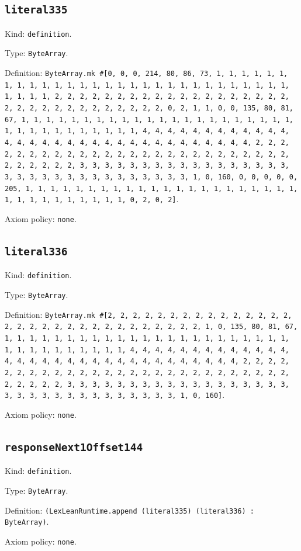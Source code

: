 \documentclass[11pt]{article}
\begin{document}
\subsection*{\texttt{literal335}}
\noindent Kind: \texttt{definition}.\par
\noindent Type: \texttt{ByteArray}.\par
\noindent Definition: \texttt{ByteArray.mk \#[0, 0, 0, 214, 80, 86, 73, 1, 1, 1, 1, 1, 1, 1, 1, 1, 1, 1, 1, 1, 1, 1, 1, 1, 1, 1, 1, 1, 1, 1, 1, 1, 1, 1, 1, 1, 1, 1, 1, 1, 2, 2, 2, 2, 2, 2, 2, 2, 2, 2, 2, 2, 2, 2, 2, 2, 2, 2, 2, 2, 2, 2, 2, 2, 2, 2, 2, 2, 2, 2, 2, 2, 0, 2, 1, 1, 0, 0, 135, 80, 81, 67, 1, 1, 1, 1, 1, 1, 1, 1, 1, 1, 1, 1, 1, 1, 1, 1, 1, 1, 1, 1, 1, 1, 1, 1, 1, 1, 1, 1, 1, 1, 1, 1, 1, 4, 4, 4, 4, 4, 4, 4, 4, 4, 4, 4, 4, 4, 4, 4, 4, 4, 4, 4, 4, 4, 4, 4, 4, 4, 4, 4, 4, 4, 4, 4, 4, 2, 2, 2, 2, 2, 2, 2, 2, 2, 2, 2, 2, 2, 2, 2, 2, 2, 2, 2, 2, 2, 2, 2, 2, 2, 2, 2, 2, 2, 2, 2, 2, 3, 3, 3, 3, 3, 3, 3, 3, 3, 3, 3, 3, 3, 3, 3, 3, 3, 3, 3, 3, 3, 3, 3, 3, 3, 3, 3, 3, 3, 3, 3, 3, 1, 0, 160, 0, 0, 0, 0, 0, 205, 1, 1, 1, 1, 1, 1, 1, 1, 1, 1, 1, 1, 1, 1, 1, 1, 1, 1, 1, 1, 1, 1, 1, 1, 1, 1, 1, 1, 1, 1, 1, 1, 0, 2, 0, 2]}.\par
\noindent Axiom policy: \texttt{none}.\par
\subsection*{\texttt{literal336}}
\noindent Kind: \texttt{definition}.\par
\noindent Type: \texttt{ByteArray}.\par
\noindent Definition: \texttt{ByteArray.mk \#[2, 2, 2, 2, 2, 2, 2, 2, 2, 2, 2, 2, 2, 2, 2, 2, 2, 2, 2, 2, 2, 2, 2, 2, 2, 2, 2, 2, 2, 2, 2, 1, 0, 135, 80, 81, 67, 1, 1, 1, 1, 1, 1, 1, 1, 1, 1, 1, 1, 1, 1, 1, 1, 1, 1, 1, 1, 1, 1, 1, 1, 1, 1, 1, 1, 1, 1, 1, 1, 1, 4, 4, 4, 4, 4, 4, 4, 4, 4, 4, 4, 4, 4, 4, 4, 4, 4, 4, 4, 4, 4, 4, 4, 4, 4, 4, 4, 4, 4, 4, 4, 4, 2, 2, 2, 2, 2, 2, 2, 2, 2, 2, 2, 2, 2, 2, 2, 2, 2, 2, 2, 2, 2, 2, 2, 2, 2, 2, 2, 2, 2, 2, 2, 2, 3, 3, 3, 3, 3, 3, 3, 3, 3, 3, 3, 3, 3, 3, 3, 3, 3, 3, 3, 3, 3, 3, 3, 3, 3, 3, 3, 3, 3, 3, 3, 3, 1, 0, 160]}.\par
\noindent Axiom policy: \texttt{none}.\par
\subsection*{\texttt{responseNext1Offset144}}
\noindent Kind: \texttt{definition}.\par
\noindent Type: \texttt{ByteArray}.\par
\noindent Definition: \texttt{(LexLeanRuntime.append (literal335) (literal336) : ByteArray)}.\par
\noindent Axiom policy: \texttt{none}.\par
\end{document}
